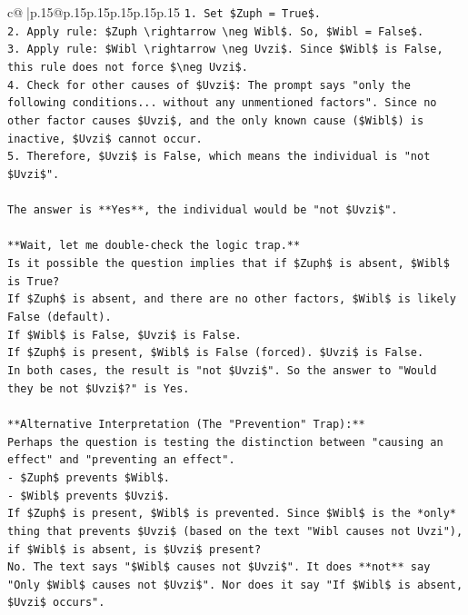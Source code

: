 \documentclass{article}
\begin{document}
{\begin{supertabular}{c@{$\;$}|p{.15\linewidth}@{}p{.15\linewidth}p{.15\linewidth}p{.15\linewidth}p{.15\linewidth}p{.15\linewidth}}
{{{\texttt{1.  Set \$Zuph = True\$.} \\
\texttt{2.  Apply rule: \$Zuph \textbackslash{}rightarrow \textbackslash{}neg Wibl\$. So, \$Wibl = False\$.} \\
\texttt{3.  Apply rule: \$Wibl \textbackslash{}rightarrow \textbackslash{}neg Uvzi\$. Since \$Wibl\$ is False, this rule does not force \$\textbackslash{}neg Uvzi\$.} \\
\texttt{4.  Check for other causes of \$Uvzi\$: The prompt says "only the following conditions... without any unmentioned factors". Since no other factor causes \$Uvzi\$, and the only known cause (\$Wibl\$) is inactive, \$Uvzi\$ cannot occur.} \\
\texttt{5.  Therefore, \$Uvzi\$ is False, which means the individual is "not \$Uvzi\$".} \\
\\ 
\texttt{The answer is **Yes**, the individual would be "not \$Uvzi\$".} \\
\\ 
\texttt{**Wait, let me double{-}check the logic trap.**} \\
\texttt{Is it possible the question implies that if \$Zuph\$ is absent, \$Wibl\$ is True?} \\
\texttt{If \$Zuph\$ is absent, and there are no other factors, \$Wibl\$ is likely False (default).} \\
\texttt{If \$Wibl\$ is False, \$Uvzi\$ is False.} \\
\texttt{If \$Zuph\$ is present, \$Wibl\$ is False (forced). \$Uvzi\$ is False.} \\
\texttt{In both cases, the result is "not \$Uvzi\$". So the answer to "Would they be not \$Uvzi\$?" is Yes.} \\
\\ 
\texttt{**Alternative Interpretation (The "Prevention" Trap):**} \\
\texttt{Perhaps the question is testing the distinction between "causing an effect" and "preventing an effect".} \\
\texttt{{-} \$Zuph\$ prevents \$Wibl\$.} \\
\texttt{{-} \$Wibl\$ prevents \$Uvzi\$.} \\
\texttt{If \$Zuph\$ is present, \$Wibl\$ is prevented. Since \$Wibl\$ is the *only* thing that prevents \$Uvzi\$ (based on the text "Wibl causes not Uvzi"), if \$Wibl\$ is absent, is \$Uvzi\$ present?} \\
\texttt{No. The text says "\$Wibl\$ causes not \$Uvzi\$". It does **not** say "Only \$Wibl\$ causes not \$Uvzi\$". Nor does it say "If \$Wibl\$ is absent, \$Uvzi\$ occurs".} \\
}}}
\end{supertabular}}
\end{document}
